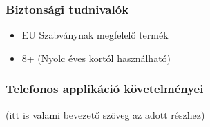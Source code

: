 \documentclass{article}
\begin{document}
\subsubsection{Biztonsági tudnivalók}
\begin{itemize}
    \item EU Szabványnak megfelelő termék
    \item 8+ (Nyolc éves kortól használható)
\end{itemize}

\subsubsection{Telefonos applikáció követelményei}

(itt is valami bevezető szöveg az adott részhez)

\begingroup
\centering
\end{document}
